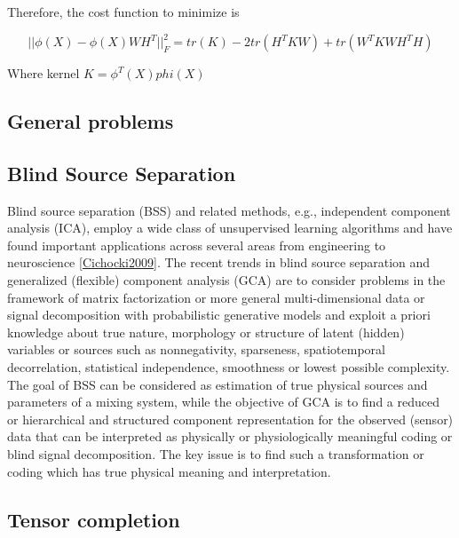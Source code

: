 \documentclass[letterpaper,12pt]{article}
\begin{document}
Therefore, the cost function to minimize is

\begin{equation}
 || \phi(X) - \phi(X)WH^T ||_F^2 = tr(K) - 2 tr(H^TKW)+tr(W^TKWH^TH)
\end{equation}

 Where kernel $K=\phi^T(X)phi(X)$
 
 

\subsection{General problems}


 \subsection{Blind Source Separation}
 
Blind source separation (BSS) and related methods, e.g., independent component analysis (ICA), employ a wide class of unsupervised learning algorithms and have found important applications across several areas from engineering to neuroscience \ref{Cichocki2009}. The recent trends in blind source separation and generalized (flexible) component analysis (GCA) are to consider problems in the framework of matrix factorization or more general multi-dimensional data or signal decomposition with probabilistic generative models and exploit a priori knowledge about true nature, morphology or structure of latent (hidden) variables or sources such as nonnegativity, sparseness, spatiotemporal decorrelation, statistical independence, smoothness or lowest possible complexity. The goal of BSS can be considered as estimation of true physical sources and parameters of a mixing system, while the objective of GCA is to find a reduced or hierarchical and structured component representation for the observed (sensor) data that can be interpreted as physically or physiologically meaningful coding or blind signal decomposition. The key issue is to find such a transformation or coding which has true physical meaning and interpretation.

 \subsection{Tensor completion}
 
\end{document}
